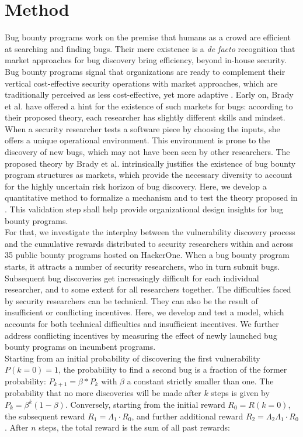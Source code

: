 \section{Method}
\label{sec:method}
Bug bounty programs work on the premise that humans as a crowd are efficient at searching and finding bugs. Their mere existence is a {\it de facto} recognition that market approaches for bug discovery bring efficiency, beyond in-house security. Bug bounty programs signal that organizations are ready to complement their vertical cost-effective security operations with market approaches, which are traditionally perceived as less cost-effective, yet more adaptive \cite{coase1937}. Early on, Brady et al. \cite{brady1999murphy} have offered a hint for the existence of such markets for bugs: according to their proposed theory, each researcher has slightly different skills and mindset. When a security researcher tests a software piece by choosing the inputs, she offers a unique operational environment. This environment is prone to the discovery of new bugs, which may not have been seen by other researchers. The proposed theory by Brady et al. \cite{brady1999murphy} intrinsically justifies the existence of bug bounty program structures as markets, which provide the necessary diversity to account for the highly uncertain risk horizon of bug discovery. Here, we develop a quantitative method to formalize a mechanism and to test the theory proposed in \cite{brady1999murphy}. This validation step shall help provide organizational design insights for bug bounty programs.\\

For that, we investigate the interplay between the vulnerability discovery process and the cumulative rewards distributed to security researchers within and across 35 public bounty programs hosted on HackerOne. When a bug bounty program starts, it attracts a number of security researchers, who in turn submit bugs. Subsequent bug discoveries get increasingly difficult for each individual researcher, and to some extent for all researchers together. The difficulties faced by security researchers can be technical. They can also be the result of insufficient or conflicting incentives. Here, we develop and test a model, which accounts for both technical difficulties and insufficient incentives. We further address conflicting incentives by measuring the effect of newly launched bug bounty programs on incumbent programs.\\

Starting from an initial probability of discovering the first vulnerability $P(k=0) = 1$, the probability to find a second bug is a fraction of the former probability: $P_{k+1} = \beta * P_k$ with $\beta$ a constant strictly smaller than one. The probability that no more discoveries will be made after $k$ steps is given by $P_k = \beta^{k} (1-\beta)$. Conversely, starting from the initial reward $R_0 = R(k=0)$, the subsequent reward $R_1 = \Lambda_1 \cdot R_0$, and further additional reward $ R_2 = \Lambda_2 \Lambda_1 \cdot R_{0}$. After $n$ steps, the total reward is the sum of all past rewards: 

